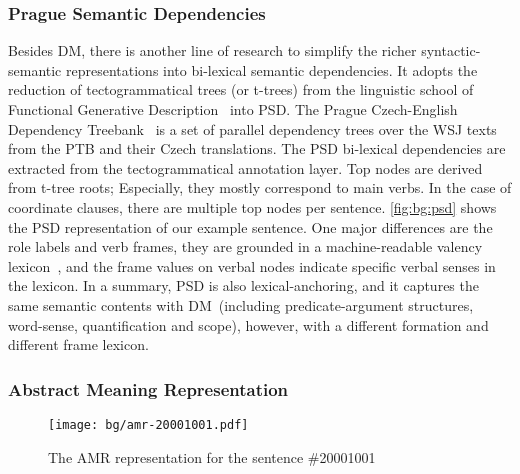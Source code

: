 \subsubsection{Prague Semantic Dependencies}
\label{sssec:bg:psd}
Besides DM, there is another line of research to simplify the richer
syntactic-semantic representations into bi-lexical semantic
dependencies. It adopts the reduction of tectogrammatical trees (or
t-trees) from the linguistic school of Functional Generative
Description~\citep[FGD,][]{Sga:Haj:Pan:86,hajic2012announcing} into
PSD. The Prague Czech-English Dependency
Treebank~\citep[PCEDT,][]{hajic2012announcing} is a set of parallel
dependency trees over the WSJ texts from the PTB and their Czech
translations. The PSD bi-lexical dependencies are extracted from the
tectogrammatical annotation layer. Top nodes are derived from t-tree
roots; Especially, they mostly correspond to main verbs. In the case
of coordinate clauses, there are multiple top nodes per
sentence. \autoref{fig:bg:psd} shows the PSD representation of our
example sentence. One major differences are the role labels and verb
frames, they are grounded in a machine-readable valency
lexicon~\citep{urevsova2016czengvallex}, and the frame values on
verbal nodes indicate specific verbal senses in the
lexicon. In a summary, PSD is also lexical-anchoring, and it
  captures the same semantic contents with DM~(including
  predicate-argument structures, word-sense, quantification and
  scope), however, with a different formation and different frame
  lexicon.



\subsubsection{Abstract Meaning Representation}
\label{ssec:bg:amr}
%
\begin{figure}[!th]
\centering
\texttt{[image: bg/amr-20001001.pdf]}
\caption{\label{fig:bg:amr} The AMR representation for the sentence
  \#20001001}
\end{figure}

